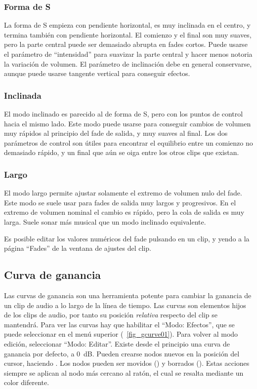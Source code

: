 \subsubsection{Forma de S}
La forma de S empieza con pendiente horizontal, es muy inclinada en el centro, y termina también con pendiente horizontal. El comienzo y el final son muy suaves, pero la parte central puede ser demasiado abrupta en fades cortos. Puede usarse el parámetro de ``intensidad'' para suavizar la parte central y hacer menos notoria la variación de volumen. El parámetro de inclinación debe en general conservarse, aunque puede usarse tangente vertical para conseguir efectos.

\subsubsection{Inclinada}
El modo inclinado es parecido al de forma de S, pero con los puntos de control hacia el mismo lado. Este modo puede usarse para conseguir cambios de volumen muy rápidos al principio del fade de salida, y muy suaves al final. Los dos parámetros de control son útiles para encontrar el equilibrio entre un comienzo no demasiado rápido, y un final que aún se oiga entre los otros clips que existan. 

\subsubsection{Largo}
El modo largo permite ajustar solamente el extremo de volumen nulo del fade. Este modo se suele usar para fades de salida muy largos y progresivos. En el extremo de volumen nominal el cambio es rápido, pero la cola de salida es muy larga. Suele sonar más musical que un modo inclinado equivalente. 

Es posible editar los valores numéricos del fade pulsando  en un clip, y yendo a la página ``Fades'' de la ventana de ajustes del clip.

\subsection{Curva de ganancia}
Las curvas de ganancia son una herramienta potente para cambiar la ganancia de un clip de audio a lo largo de la línea de tiempo. Las curvas son elementos hijos de los clips de audio, por tanto su posición \emph{relativa} respecto del clip se mantendrá. Para ver las curvas hay que habilitar el ``Modo: Efectos'', que se puede seleccionar en el menú superior (\FigB~\ref{fig_gcurve01}). Para volver al modo edición, seleccionar ``Modo: Editar''. Existe desde el principio una curva de ganancia por defecto, a 0~dB. Pueden crearse nodos nuevos en la posición del cursor, haciendo . Los nodos pueden ser movidos () y borrados (). Estas acciones siempre se aplican al nodo más cercano al ratón, el cual se resalta mediante un color diferente.

